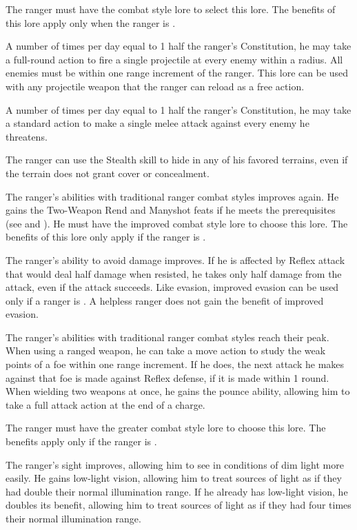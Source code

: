 The ranger must have the combat style lore to select this lore.
The benefits of this lore apply only when the ranger is \unencumbered.

A number of times per day equal to 1 \add half the ranger's Constitution, he may take a full-round action to fire a single projectile at every enemy within a \areamed radius.
All enemies must be within one range increment of the ranger.
This lore can be used with any projectile weapon that the ranger can reload as a free action.

A number of times per day equal to 1 \add half the ranger's Constitution, he may take a standard action to make a single melee attack against every enemy he threatens.

\label{Camouflage}
The ranger can use the Stealth skill to hide in any of his favored terrains, even if the terrain does not grant cover or concealment.

The ranger's abilities with traditional ranger combat styles improves again.
He gains the Two-Weapon Rend and Manyshot feats if he meets the prerequisites (see  and ).
He must have the improved combat style lore to choose this lore.
The benefits of this lore only apply if the ranger is \unencumbered.

The ranger's ability to avoid damage improves.
If he is affected by Reflex attack that would deal half damage when resisted, he takes only half damage from the attack, even if the attack succeeds.
Like evasion, improved evasion can be used only if a ranger is \unencumbered.
A helpless ranger does not gain the benefit of improved evasion.

The ranger's abilities with traditional ranger combat styles reach their peak.
When using a ranged weapon, he can take a move action to study the weak points of a foe within one range increment.
If he does, the next attack he makes against that foe is made against Reflex defense, if it is made within 1 round.
When wielding two weapons at once, he gains the pounce ability, allowing him to take a full attack action at the end of a charge.

The ranger must have the greater combat style lore to choose this lore.
The benefits apply only if the ranger is \unencumbered.

The ranger's sight improves, allowing him to see in conditions of dim light more easily.
He gains low-light vision, allowing him to treat sources of light as if they had double their normal illumination range.
If he already has low-light vision, he doubles its benefit, allowing him to treat sources of light as if they had four times their normal illumination range.

